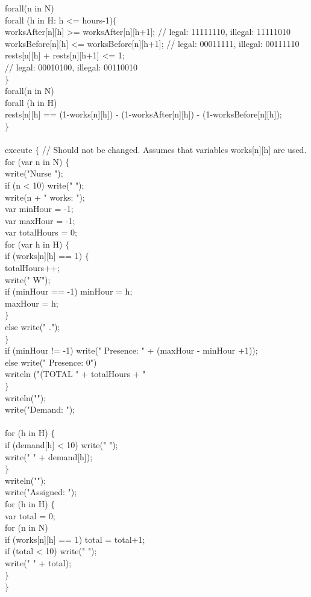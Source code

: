\documentclass[11pt]{article}
\begin{document}
\begin{appendix}
{forall(n in N)\\
forall (h in H: h <= hours-1)$\{$\\
worksAfter[n][h] >= worksAfter[n][h+1]; // legal: 11111110, illegal: 11111010\\
worksBefore[n][h] <= worksBefore[n][h+1]; // legal: 00011111, illegal: 00111110\\
rests[n][h] + rests[n][h+1] <= 1;\\
// legal: 00010100, illegal: 00110010\\
$\}$\\
forall(n in N)\\
forall (h in H)\\
rests[n][h] == (1-works[n][h]) - (1-worksAfter[n][h]) - (1-worksBefore[n][h]); \\
$\}$ \\
\\
execute $\{$ // Should not be changed. Assumes that variables works[n][h] are used.\\
for (var n in N) $\{$\\
write("Nurse ");\\
if (n < 10) write(" ");\\
write(n + " works: ");\\
var minHour = -1;\\
var maxHour = -1;\\
var totalHours = 0;\\
for (var h in H) $\{$\\
if (works[n][h] == 1) $\{$\\
totalHours++;\\
write(" W"); \\
if (minHour == -1) minHour = h;\\
maxHour = h; \\
$\}$\\
else write(" .");\\
$\}$\\
if (minHour != -1) write(" Presence: " + (maxHour - minHour +1));\\
else write(" Presence: 0")\\
writeln ("(TOTAL " + totalHours + "\\
$\}$\\
writeln("");\\
write("Demand: ");\\
\\
for (h in H) $\{$\\
if (demand[h] < 10) write(" ");\\
write(" " + demand[h]); \\
$\}$\\
writeln("");\\
write("Assigned: ");\\
for (h in H) $\{$\\
var total = 0;\\
for (n in N)\\
if (works[n][h] == 1) total = total+1;\\
if (total < 10) write(" ");\\
write(" " + total); \\
$\}$ \\
$\}$\\
}


\end{appendix}
\end{document}
